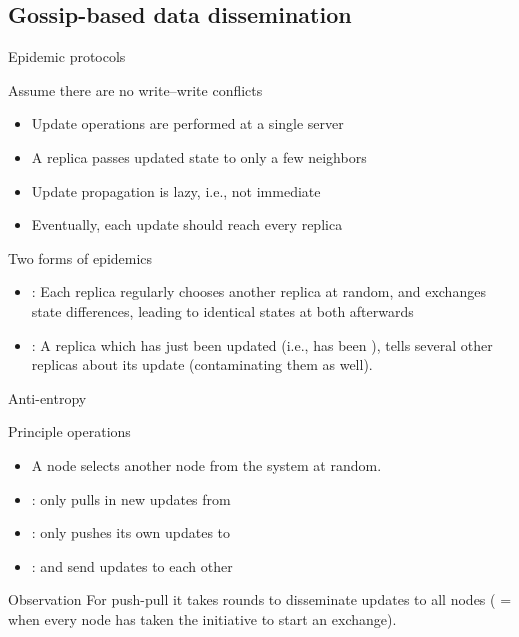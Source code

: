 \subsection{Gossip-based data dissemination}
\begin{slide}{Epidemic protocols}
  \begin{block}{Assume there are no write--write conflicts}
    \begin{itemize}\tightlist
    \item Update operations are performed at a single server
    \item A replica passes updated state to only a few neighbors
    \item Update propagation is lazy, i.e., not immediate
    \item Eventually, each update should reach every replica
    \end{itemize}
  \end{block}
  \begin{block}{Two forms of epidemics}
    \begin{itemize}\tightlist
    \item {}: Each replica regularly chooses another replica at random, and exchanges state
      differences, leading to identical states at both afterwards
    \item {}: A replica which has just been updated (i.e., has been ),
      tells several other replicas about its update (contaminating them as well).
    \end{itemize}
  \end{block}
\end{slide}
\begin{slide}{Anti-entropy}
  \begin{block}{Principle operations}
    \begin{itemize}\tightlist
    \item A node  selects another node  from the system at random.
    \item {}:  only pulls in new updates from 
    \item {}:  only pushes its own updates to 
    \item {}:  and  send updates to each other
    \end{itemize}
  \end{block}
  \begin{block}{Observation} 
    For push-pull it takes  rounds to disseminate updates to all 
    nodes ( = when every node has taken the initiative to start an exchange).
  \end{block}
\end{slide}
